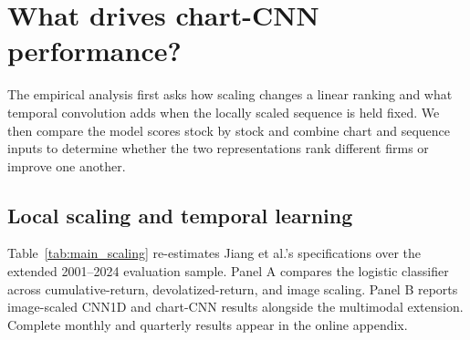 \section{What drives chart-CNN performance?}\label{sec:mechanism_results}

The empirical analysis first asks how scaling changes a linear ranking and what temporal convolution adds when the locally scaled sequence is held fixed. We then compare the model scores stock by stock and combine chart and sequence inputs to determine whether the two representations rank different firms or improve one another.

\subsection{Local scaling and temporal learning}\label{subsec:scaling_results}\label{subsec:temporal_results}

Table~\ref{tab:main_scaling} re-estimates Jiang et al.'s specifications over the extended 2001--2024 evaluation sample. Panel A compares the logistic classifier across cumulative-return, devolatized-return, and image scaling. Panel B reports image-scaled CNN1D and chart-CNN results alongside the multimodal extension. Complete monthly and quarterly results appear in the online appendix.

